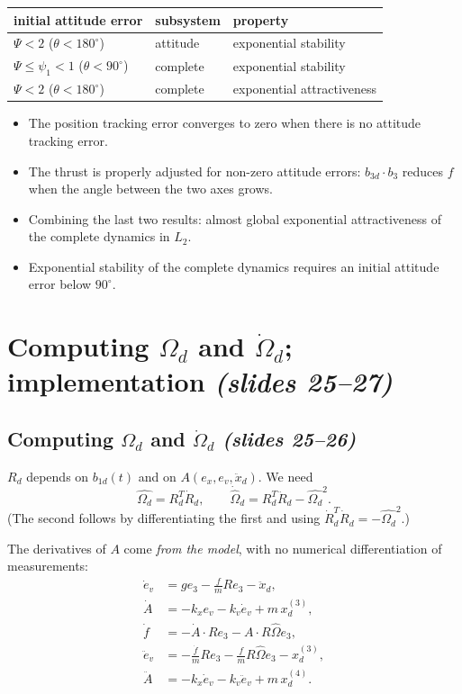 \documentclass[11pt,a4paper]{article}
\newcommand{\hatm}[1]{\widehat{#1}}          %
\newcommand{\ex}{e_x}
\newcommand{\ev}{e_v}
\newcommand{\Od}{\Omega_d}
\newcommand{\sli}[1]{\emph{(#1)}}
\theoremstyle{definition}
\theoremstyle{plain}
\theoremstyle{remark}
\begin{document}
\begin{center}
\small
\begin{tabular}{l l l}
\toprule
initial attitude error & subsystem & property \\
\midrule
$\Psi<2$ ($\theta<180^\circ$) & attitude & exponential stability \\
$\Psi\le\psi_1<1$ ($\theta<90^\circ$) & complete & exponential stability \\
$\Psi<2$ ($\theta<180^\circ$) & complete & exponential attractiveness \\
\bottomrule
\end{tabular}
\end{center}
\begin{itemize}
  \item The position tracking error converges to zero when there is no attitude tracking error.
  \item The thrust is properly adjusted for non-zero attitude errors: $b_{3d}\cdot b_3$ reduces $f$ when the angle between the two axes grows.
  \item Combining the last two results: almost global exponential attractiveness of the complete dynamics in $L_2$.
  \item Exponential stability of the complete dynamics requires an initial attitude error below $90^\circ$.
\end{itemize}

\section{Computing $\Omega_d$ and $\dot\Omega_d$; implementation \sli{slides 25--27}}

\subsection{Computing $\Omega_d$ and $\dot\Omega_d$ \sli{slides 25--26}}

$R_d$ depends on $b_{1d}(t)$ and on $A(\ex,\ev,\ddot x_d)$. We need
\[
\hatm\Od=R_d^T\dot R_d,\qquad \dot{\hatm\Omega}_d=R_d^T\ddot R_d-\hatm\Od^2 .
\]
(The second follows by differentiating the first and using $\dot R_d^T\dot R_d=-\hatm\Od^2$.)

The derivatives of $A$ come \emph{from the model}, with no numerical differentiation of measurements:
\begin{align*}
\dot\ev&=ge_3-\tfrac fmRe_3-\ddot x_d,\\
\dot A&=-k_x\ev-k_v\dot\ev+m\,x_d^{(3)},\\
\dot f&=-\dot A\cdot Re_3-A\cdot R\hatm\Omega e_3,\\
\ddot\ev&=-\tfrac{\dot f}mRe_3-\tfrac fmR\hatm\Omega e_3-x_d^{(3)},\\
\ddot A&=-k_x\dot\ev-k_v\ddot\ev+m\,x_d^{(4)}.
\end{align*}
\end{document}
